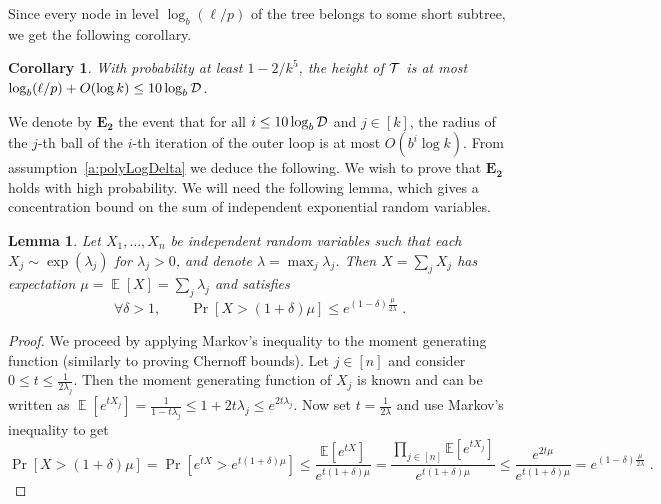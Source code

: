 \documentclass[twoside,leqno,twocolumn]{article}
\newtheorem{lemma}[theorem]{Lemma}
\newtheorem{corollary}[theorem]{Corollary}
\DeclareMathOperator*{\EX}{{\mathbb E}}
\begin{document}
Since every node in level $\log _b (\ell/p)$ of the tree belongs to some short subtree, we get the following corollary.
\begin{corollary} \label{c:height}
With probability at least $1-2/k^5$, the height of ${\cal T}$ is at most $\log_b (\ell/p) + O(\log k) \le 10 \log_b {\mathcal D}$.
\end{corollary}

We denote by $\mathbf{E_2}$ the event that for all $i \le 10 \log_b {\mathcal D}$ and $j \in [k]$, the radius of the $j$-th ball of the $i$-th iteration of the outer loop is at most $O(b^i \log k)$.
\ifprocs
From assumption~\ref{a:polyLogDelta} we deduce the following.
\else
\fi
We wish to prove that $\mathbf{E_2}$ holds with high probability. We will need the following lemma, which gives a concentration bound on the sum of independent exponential random variables.
\begin{lemma}\label{l:conc}
Let $X_1,\ldots,X_n$ be independent random variables
such that each $X_j \sim \exp(\lambda_j)$ for $\lambda_j>0$,
and denote $\lambda = \max_j \lambda_j$.
Then $X = \sum_j {X_j}$ 
has expectation $\mu = \EX[X] = \sum_{j}{\lambda_j}$ 
and satisfies
$$
  \forall \delta > 1, \quad \quad \Pr[X > (1+ \delta) \mu] \le e^{(1 - \delta) \frac{\mu}{2 \lambda}} \; .
$$
\end{lemma}
\begin{proof}
We proceed by applying Markov's inequality to the moment generating function
(similarly to proving Chernoff bounds).
Let $j \in [n]$ and consider $0\le t \le \frac{1}{2 \lambda_j}$.
Then the moment generating function of $X_j$ is known and can be written as
$\EX\left[ e^{t X_j} \right] = \frac{1}{1 - t \lambda_j} 
\le 1 + 2 t \lambda_j \le e^{2 t \lambda_j}$.
Now set $t = \frac{1}{2 \lambda}$ and use Markov's inequality to get
\begin{equation*}
\Pr[X > (1+ \delta) \mu] = \Pr[e^{t X} > e^{t(1+ \delta) \mu}] \le \frac{\mathbb{E}\left[e^{t X} \right]}{e^{t(1+ \delta) \mu}} = \frac{\prod_{j \in [n]}{\mathbb{E}\left[ e^{t X_j} \right]}}{e^{t(1+ \delta) \mu}} \le \frac{e^{2t \mu}}{e^{t(1+ \delta) \mu}} = e^{(1 - \delta) \frac{\mu}{2 \lambda}} \;.
\end{equation*}
\end{proof}
\end{document}
